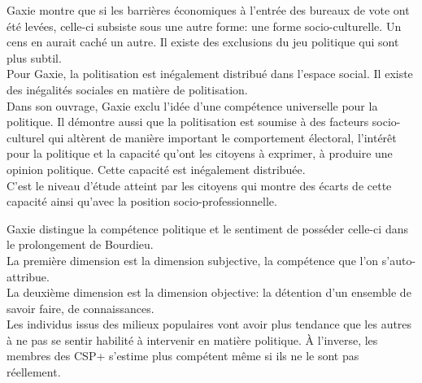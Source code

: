 \documentclass[12pt, a4paper, openany]{book}
\begin{document}
Gaxie montre que si les barrières économiques à l'entrée des bureaux de vote ont été levées, celle-ci subsiste sous une autre forme: une forme socio-culturelle. Un cens en aurait caché un autre. Il existe des exclusions du jeu politique qui sont plus subtil. \\
Pour Gaxie, la politisation est inégalement distribué dans l'espace social. Il existe des inégalités sociales en matière de politisation. \\
Dans son ouvrage, Gaxie exclu l'idée d'une compétence universelle pour la politique. Il démontre aussi que la politisation est soumise à des facteurs socio-culturel qui altèrent de manière important le comportement électoral, l'intérêt pour la politique et la capacité qu'ont les citoyens à exprimer, à produire une opinion politique. Cette capacité est inégalement distribuée. \\
C'est le niveau d'étude atteint par les citoyens qui montre des écarts de cette capacité ainsi qu'avec la position socio-professionnelle.


Gaxie distingue la compétence politique et le sentiment de posséder celle-ci dans le prolongement de Bourdieu. \\
La première dimension est la dimension subjective, la compétence que l'on s'auto-attribue. \\
La deuxième dimension est la dimension objective: la détention d'un ensemble de savoir faire, de connaissances. \\
Les individus issus des milieux populaires vont avoir plus tendance que les autres à ne pas se sentir habilité à intervenir en matière politique. À l'inverse, les membres des CSP+ s'estime plus compétent même si ils ne le sont pas réellement. 
\end{document}
